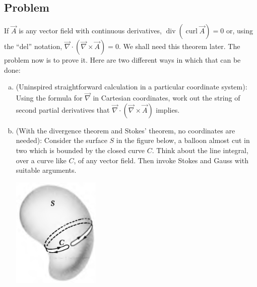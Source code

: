 \documentclass[solutions]{esg8022pset}
\begin{document}
\subsection{Problem}
  If $\vec A$ is any vector field with continuous derivatives, $\operatorname{div}(\operatorname{curl}\vec A) = 0$ or, using the ``del'' notation, $\vec \nabla \cdot (\vec \nabla \times \vec A) = 0$. We shall need this theorem later. The problem now is to prove it. Here are two different ways in which that can be done:
  \begin{enumerate}[(a)]
    \item (Uninspired straightforward calculation in a particular coordinate system): Using the formula for $\vec\nabla$ in Cartesian coordinates, work out the string of second partial derivatives that $\vec \nabla \cdot (\vec \nabla \times \vec A)$ implies.
    \item (With the divergence theorem and Stokes' theorem, no coordinates are needed): Consider the surface $S$ in the figure below, a balloon almost cut in two which is bounded by the closed curve $C$. Think about the line integral, over a curve like $C$, of any vector field. Then invoke Stokes and Gauss with suitable arguments.
      \begin{center}\includegraphics[width=0.33\textwidth]{ps03_02}\end{center}
  \end{enumerate}
\end{document}
